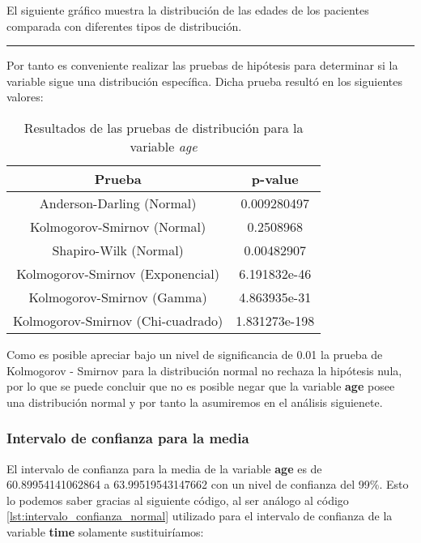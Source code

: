 \documentclass[a4paper,12pt]{article}
\begin{document}
    El siguiente gráfico muestra la distribución de las edades de los pacientes comparada con diferentes tipos de distribución.


\hrule height 0.5mm

Por tanto es conveniente realizar las pruebas de hipótesis para determinar si la variable
sigue una distribución específica. Dicha prueba resultó en los siguientes valores:

\begin{table}[h!]
    \centering
    \begin{tabular}{|c|c|}
        \hline
        \textbf{Prueba} & \textbf{p-value} \\
        \hline
        Anderson-Darling (Normal) & 0.009280497 \\
        \hline
        Kolmogorov-Smirnov (Normal) & 0.2508968 \\
        \hline
        Shapiro-Wilk (Normal) & 0.00482907 \\
        \hline
        Kolmogorov-Smirnov (Exponencial) & 6.191832e-46 \\
        \hline
        Kolmogorov-Smirnov (Gamma) & 4.863935e-31 \\
        \hline
        Kolmogorov-Smirnov (Chi-cuadrado) & 1.831273e-198 \\
        \hline
    \end{tabular}
    \caption{Resultados de las pruebas de distribución para la variable \textit{age}}
    \label{tab:pruebas_distribucion_age}
\end{table}

    Como es posible apreciar bajo un nivel de significancia de 0.01 la prueba de Kolmogorov - Smirnov para la distribución normal no rechaza la hipótesis nula, por lo que se puede concluir que no es posible negar que la variable \textbf{age} posee una distribución normal y por tanto la  asumiremos en el análisis siguienete.
    
    \subsubsection*{Intervalo de confianza para la media}

    El intervalo de confianza para la media de la variable \textbf{age} es de 60.89954141062864 a 63.99519543147662 con un nivel de confianza del 99\%. Esto lo podemos saber gracias al siguiente código, al ser análogo al código \ref{lst:intervalo_confianza_normal} utilizado para el intervalo de confianza de la variable \textbf{time} solamente sustituiríamos:
\end{document}
